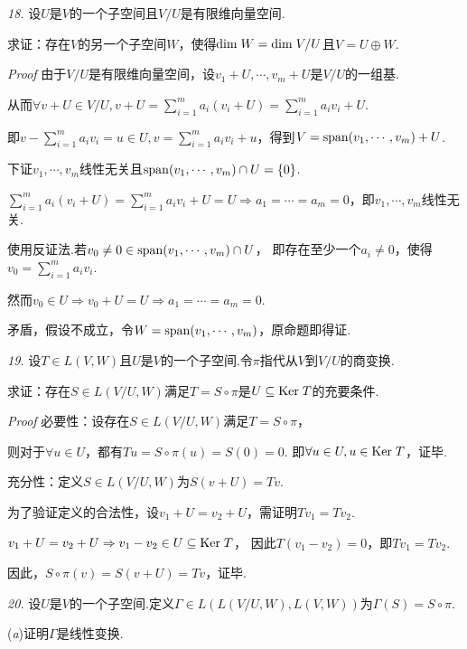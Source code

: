 \newpage

\textit{18.}
设\(U\)是\(V\)的一个子空间且\(V/U\)是有限维向量空间.

求证：存在\(V\)的另一个子空间\(W\)，使得\(\mathrm{dim \;} W=\mathrm{dim \;} V/U\)且\(V=U \oplus W\).

\textit{Proof}
由于\(V/U\)是有限维向量空间，设\(v_1+U,\cdots,v_m+U\)是\(V/U\)的一组基.

从而\(\forall v+U \in V/U,v+U=\sum_{i=1}^m a_i(v_i+U)=\sum_{i=1}^m a_iv_i+U\).

即\(v-\sum_{i=1}^m a_iv_i=u \in U,v=\sum_{i=1}^m a_iv_i+u\)，得到\(V=\mathrm{span} (v_1,\cdots,v_m)+U\).

下证\(v_1,\cdots,v_m\)线性无关且\(\mathrm{span} (v_1,\cdots,v_m) \cap U =\{0\}\).

\(\sum_{i=1}^m a_i(v_i+U)=\sum_{i=1}^m a_iv_i+U=U \Rightarrow a_1=\cdots=a_m=0\)，即\(v_1,\cdots,v_m\)线性无关.

使用反证法.若\(v_0 \ne 0 \in \mathrm{span} (v_1,\cdots,v_m) \cap U\)，
即存在至少一个\(a_i \ne 0\)，使得\(v_0=\sum_{i=1}^m a_iv_i\).

然而\(v_0 \in U \Rightarrow v_0+U=U \Rightarrow a_1=\cdots=a_m=0\).

矛盾，假设不成立，令\(W=\mathrm{span} (v_1,\cdots,v_m)\)，原命题即得证.

\hspace*{\fill}

\textit{19.}
设\(T \in L(V,W)\)且\(U\)是\(V\)的一个子空间.令\(\pi\)指代从\(V\)到\(V/U\)的商变换.

求证：存在\(S \in L(V/U,W)\)满足\(T=S \circ \pi\)是\(U \subseteq \mathrm{Ker \;} T\)的充要条件.

\textit{Proof}
必要性：设存在\(S \in L(V/U,W)\)满足\(T=S \circ \pi\)，

则对于\(\forall u \in U\)，都有\(Tu=S \circ \pi(u)=S(0)=0\).
即\(\forall u \in U,u \in \mathrm{Ker \;} T\)，证毕.

充分性：定义\(S \in L(V/U,W)\)为\(S(v+U)=Tv\).

为了验证定义的合法性，设\(v_1+U=v_2+U\)，需证明\(Tv_1=Tv_2\).

\(v_1+U=v_2+U \Rightarrow v_1-v_2 \in U \subseteq \mathrm{Ker \;} T\)，
因此\(T(v_1-v_2)=0\)，即\(Tv_1=Tv_2\).

因此，\(S \circ \pi(v)=S(v+U)=Tv\)，证毕.

\hspace*{\fill}

\textit{20.}
设\(U\)是\(V\)的一个子空间.定义\(\Gamma \in L(L(V/U,W),L(V,W))\)为\(\Gamma(S)=S \circ \pi\).

(\textit{a})证明\(\Gamma\)是线性变换.

